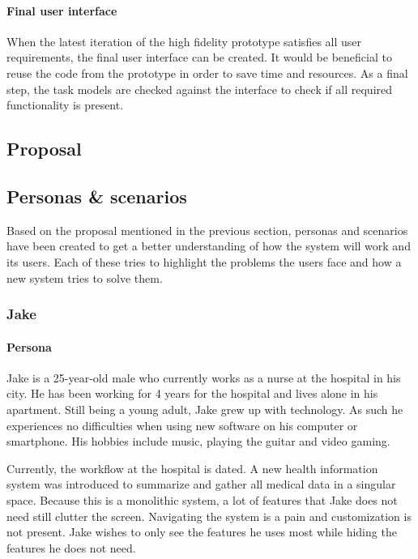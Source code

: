         \paragraph{Final user interface} When the latest iteration of the high fidelity prototype satisfies all user requirements, the final user interface can be created. It would be beneficial to reuse the code from the prototype in order to save time and resources. As a final step, the task models are checked against the interface to check if all required functionality is present.

    \subsection{Proposal}

    \subsection{Personas \& scenarios}

    Based on the proposal mentioned in the previous section, personas and scenarios have been created to get a better understanding of how the system will work and its users. Each of these tries to highlight the problems the users face and how a new system tries to solve them.

        \subsubsection{Jake}

        \paragraph{Persona} Jake is a 25-year-old male who currently works as a nurse at the hospital in his city. He has been working for 4 years for the hospital and lives alone in his apartment. Still being a young adult, Jake grew up with technology. As such he experiences no difficulties when using new software on his computer or smartphone. His hobbies include music, playing the guitar and video gaming.

        Currently, the workflow at the hospital is dated. A new health information system was introduced to summarize and gather all medical data in a singular space. Because this is a monolithic system, a lot of features that Jake does not need still clutter the screen. Navigating the system is a pain and customization is not present. Jake wishes to only see the features he uses most while hiding the features he does not need.
        
